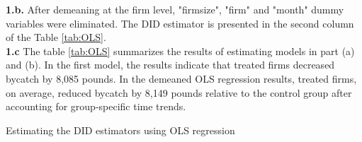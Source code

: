 \documentclass{article}
\begin{document}
\noindent \textbf{1.b.} After demeaning at the firm level, "firmsize", "firm" and "month" dummy variables were eliminated. The DID estimator is presented in the second column of the Table \ref{tab:OLS}. \\

\noindent \textbf{1.c} The table \ref{tab:OLS} summarizes the results of estimating models in part (a) and (b). In the first model, the results indicate that treated firms decreased bycatch by 8,085 pounds. In the demeaned OLS regression results, treated firms, on average, reduced bycatch by 8,149 pounds relative to the control group after accounting for group-specific time trends.

\begin{table}[]
    \centering
    
    \caption{Estimating the DID estimators using OLS regression}
    \label{tab:OLS}
\end{table}
\end{document}
